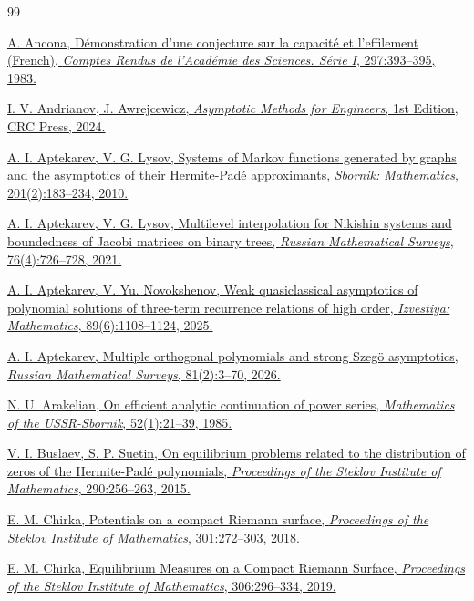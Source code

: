 \documentclass[11pt, a4paper, twoside]{article}
\theoremstyle{plain}
\theoremstyle{definition}
\begin{document}
\begin{thebibliography}{99}

 \href{https://zbmath.org/0544.31006}{A. Ancona, Démonstration d’une conjecture sur la capacité et l’effilement (French), \textit{Comptes Rendus de l’Académie des Sciences. Série I}, 297:393--395, 1983.}

 \href{https://doi.org/10.1201/9781003467465}{I. V. Andrianov, J. Awrejcewicz, \textit{Asymptotic Methods for Engineers}, 1st Edition, CRC Press, 2024.}

 \href{https://www.mathnet.ru/eng/msb7515}{A. I. Aptekarev, V. G. Lysov, Systems of Markov functions generated by graphs and the asymptotics of their Hermite-Padé approximants, \textit{Sbornik: Mathematics}, 201(2):183--234, 2010.}

 \href{https://www.mathnet.ru/eng/umn10017}{A. I. Aptekarev, V. G. Lysov, Multilevel interpolation for Nikishin systems and boundedness of Jacobi matrices on binary trees, \textit{Russian Mathematical Surveys}, 76(4):726--728, 2021.}

 \href{https://www.mathnet.ru/eng/im9695}{A. I. Aptekarev, V. Yu. Novokshenov, Weak quasiclassical asymptotics of polynomial solutions of three-term recurrence relations of high order, \textit{Izvestiya: Mathematics}, 89(6):1108--1124, 2025.}

 \href{https://www.mathnet.ru/eng/umn10281}{A. I. Aptekarev, Multiple orthogonal polynomials and strong Szeg\"o asymptotics, \textit{Russian Mathematical Surveys}, 81(2):3--70, 2026.}

 \href{https://www.mathnet.ru/eng/msb2038}{N. U. Arakelian, On efficient analytic continuation of power series, \textit{Mathematics of the USSR-Sbornik}, 52(1):21--39, 1985.}

 \href{https://www.mathnet.ru/eng/tm3645}{V. I. Buslaev, S. P. Suetin, On equilibrium problems related to the distribution of zeros of the Hermite-Padé polynomials, \textit{Proceedings of the Steklov Institute of Mathematics}, 290:256--263, 2015.}

 \href{https://www.mathnet.ru/eng/tm3918}{E. M. Chirka, Potentials on a compact Riemann surface, \textit{Proceedings of the Steklov Institute of Mathematics}, 301:272--303, 2018.}

 \href{https://www.mathnet.ru/eng/tm4007}{E. M. Chirka, Equilibrium Measures on a Compact Riemann Surface, \textit{Proceedings of the Steklov Institute of Mathematics}, 306:296--334, 2019.}


\end{thebibliography}
\end{document}
